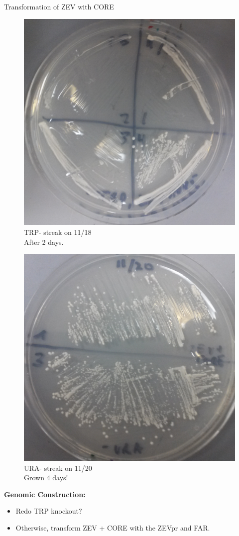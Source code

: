 \documentclass{beamer}
\begin{document}
\begin{frame}{Transformation of ZEV with CORE}
    \begin{minipage}[ht!]{0.48\textwidth}
    \begin{figure}[ht!]
        \centering
        \includegraphics[width=.8\textwidth]{TRPstreak1118.png}
        \caption{TRP- streak on 11/18\\ After 2 days.}
        \label{fig:urastreak}
    \end{figure}
    \end{minipage}
        \hfill
    \begin{minipage}[ht!]{0.48\textwidth}
    \begin{figure}[ht!]
        \centering
        \includegraphics[width=.8\textwidth]{URAstreak1120.png}
        \caption{URA- streak on 11/20\\ Grown 4 days!}
        \label{fig:urastreak}
    \end{figure}
    \end{minipage}
    \textbf{Genomic Construction:}
    \begin{itemize}
        \item Redo TRP knockout?
        \item Otherwise, transform ZEV + CORE with the ZEVpr and FAR.
    \end{itemize}

\end{frame}
\end{document}
